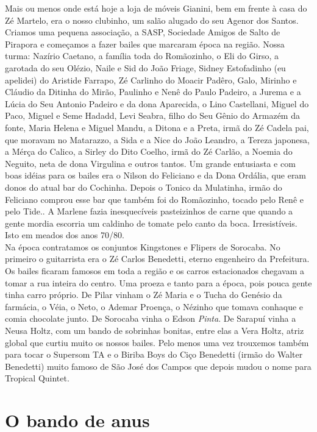 \documentclass[12pt,brazil,]{book}
\begin{document}
Mais ou menos onde está hoje a loja de móveis Gianini, bem em frente à
casa do Zé Martelo, era o nosso clubinho, um salão alugado do seu Agenor
dos Santos. Criamos uma pequena associação, a SASP, Sociedade Amigos de
Salto de Pirapora e começamos a fazer bailes que marcaram época na
região. Nossa turma: Nazírio Caetano, a família toda do Romãozinho, o
Eli do Girso, a garotada do seu Olézio, Naile e Sid do João Friage,
Sidney Estofadinho (eu apelidei) do Aristide Farrapo, Zé Carlinho do
Moacir Padêro, Galo, Mirinho e Cláudio da Ditinha do Mirão, Paulinho e
Nenê do Paulo Padeiro, a Jurema e a Lúcia do Seu Antonio Padeiro e da
dona Aparecida, o Lino Castellani, Miguel do Paco, Miguel e Seme Hadadd,
Levi Seabra, filho do Seu Gênio do Armazém da fonte, Maria Helena e
Miguel Mandu, a Ditona e a Preta, irmã do Zé Cadela pai, que moravam no
Matarazzo, a Sida e a Nice do João Leandro, a Tereza japonesa, a Mérça
do Calico, a Sirley do Dito Coelho, irmã do Zé Carlão, a Noemia do
Neguito, neta de dona Virgulina e outros tantos. Um grande entusiasta e
com boas idéias para os bailes era o Nilson do Feliciano e da Dona
Ordália, que eram donos do atual bar do Cochinha. Depois o Tonico da
Mulatinha, irmão do Feliciano comprou esse bar que também foi do
Romãozinho, tocado pelo Renê e pelo Tide.. A Marlene fazia inesquecíveis
pasteizinhos de carne que quando a gente mordia escorria um caldinho de
tomate pelo canto da boca. Irresistíveis. Isto em meados dos anos
70/80.\\
Na época contratamos os conjuntos Kingstones e Flipers de Sorocaba. No
primeiro o guitarrista era o Zé Carlos Benedetti, eterno engenheiro da
Prefeitura. Os bailes ficaram famosos em toda a região e os carros
estacionados chegavam a tomar a rua inteira do centro. Uma proeza e
tanto para a época, pois pouca gente tinha carro próprio. De Pilar
vinham o Zé Maria e o Tucha do Genésio da farmácia, o Véia, o Neto, o
Ademar Proença, o Nézinho que tomava conhaque e comia chocolate junto.
De Sorocaba vinha o Edson \emph{Pinta}. De Sarapuí vinha a Neusa Holtz,
com um bando de sobrinhas bonitas, entre elas a Vera Holtz, atriz global
que curtiu muito os nossos bailes. Pelo menos uma vez trouxemos também
para tocar o Supersom TA e o Biriba Boys do Ciço Benedetti (irmão do
Walter Benedetti) muito famoso de São José dos Campos que depois mudou o
nome para Tropical Quintet.

\section{O bando de anus}\label{o-bando-de-anus}
\end{document}
